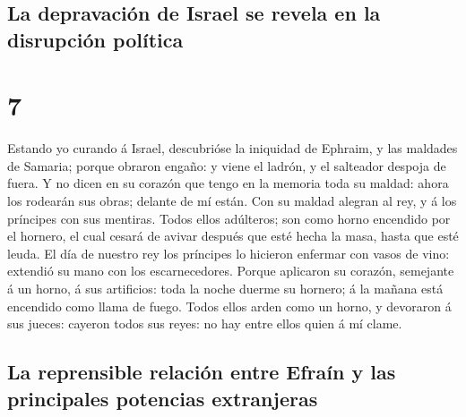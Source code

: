 \hypertarget{la-depravaciuxf3n-de-israel-se-revela-en-la-disrupciuxf3n-poluxedtica}{%
\subsection{La depravación de Israel se revela en la disrupción
política}\label{la-depravaciuxf3n-de-israel-se-revela-en-la-disrupciuxf3n-poluxedtica}}

\hypertarget{section-6}{%
\section{7}\label{section-6}}

 Estando yo curando á Israel, descubrióse la iniquidad de
Ephraim, y las maldades de Samaria; porque obraron engaño: y viene el
ladrón, y el salteador despoja de fuera.  Y no dicen en su
corazón que tengo en la memoria toda su maldad: ahora los rodearán sus
obras; delante de mí están.  Con su maldad alegran al rey, y
á los príncipes con sus mentiras.  Todos ellos adúlteros;
son como horno encendido por el hornero, el cual cesará de avivar
después que esté hecha la masa, hasta que esté leuda.  El
día de nuestro rey los príncipes lo hicieron enfermar con vasos de vino:
extendió su mano con los escarnecedores.  Porque aplicaron
su corazón, semejante á un horno, á sus artificios: toda la noche duerme
su hornero; á la mañana está encendido como llama de fuego. 
Todos ellos arden como un horno, y devoraron á sus jueces: cayeron todos
sus reyes: no hay entre ellos quien á mí clame.

\hypertarget{la-reprensible-relaciuxf3n-entre-efrauxedn-y-las-principales-potencias-extranjeras}{%
\subsection{La reprensible relación entre Efraín y las principales
potencias
extranjeras}\label{la-reprensible-relaciuxf3n-entre-efrauxedn-y-las-principales-potencias-extranjeras}}

